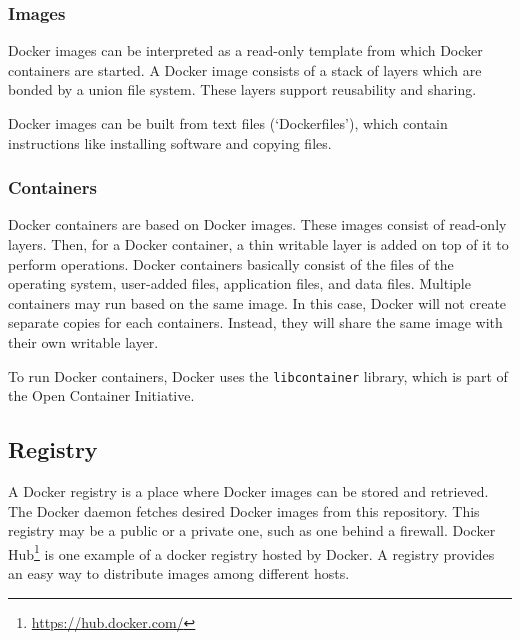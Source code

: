 \subsubsection{Images}
Docker images can be interpreted as a read-only template from which Docker containers are
started. A Docker image consists of a stack of layers which are bonded by a union
file system. These layers support reusability and sharing.

Docker images can be built from text files (`Dockerfiles'), which contain instructions like installing software and copying files.

\subsubsection{Containers}
Docker containers are based on Docker images. These images consist of read-only
layers. Then, for a Docker container, a thin writable layer is added on top of it to
perform operations. Docker containers basically consist of the files of the operating system,
user-added files, application files, and data files. Multiple containers may run
based on the same image. In this case, Docker will not create separate copies for
each containers. Instead, they will share the same image with their own writable
layer.

To run Docker containers, Docker uses the \verb|libcontainer| library, which is part of the Open Container Initiative.

\subsection{Registry}
A Docker registry is a place where Docker images can be stored and retrieved. The Docker daemon
fetches desired Docker images from this repository. This registry may be a
public or a private one, such as one behind a firewall. Docker
Hub\footnote{\url{https://hub.docker.com/}} is one example of a docker registry
hosted by Docker. A registry provides an easy way to distribute images among different hosts.
